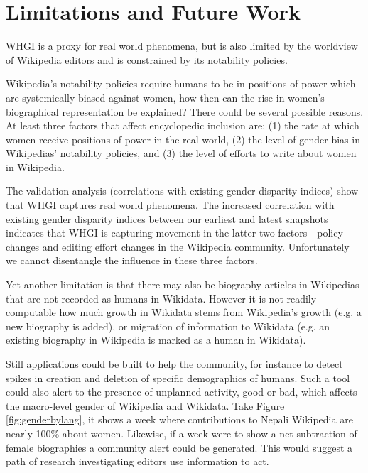 \documentclass{sig-alternate-05-2015}
\begin{document}
\section{Limitations and Future Work}
WHGI is a proxy for real world phenomena, but is also limited by the worldview of Wikipedia editors and is constrained by its notability policies. 

Wikipedia's notability policies require humans to be in positions of power which are systemically biased against women, how then can the rise in women's biographical representation be explained? There could be several possible reasons. At least three factors that affect encyclopedic inclusion are: (1) the rate at which women receive positions of power in the real world, (2) the level of gender bias in Wikipedias' notability policies, and (3) the level of efforts to write about women in Wikipedia. 

The validation analysis (correlations with existing gender disparity indices) show that WHGI captures real world phenomena. The increased correlation with existing gender disparity indices between our earliest and latest snapshots indicates that WHGI is capturing movement in the latter two factors - policy changes and editing effort changes in the Wikipedia community. Unfortunately we cannot disentangle the influence in these three factors.

Yet another limitation is that there may also be biography articles in Wikipedias that are not recorded as humans in Wikidata. However it is not readily computable how much growth in Wikidata stems from Wikipedia's growth (e.g. a new biography is added), or migration of information to Wikidata (e.g. an existing biography in Wikipedia is marked as a human in Wikidata).

Still applications could be built to help the community, for instance to detect spikes in creation and deletion of specific demographics of humans. Such a tool could also alert to the presence of unplanned activity, good or bad, which affects the macro-level gender of Wikipedia and Wikidata. Take Figure \ref{fig:genderbylang}, it shows a week where contributions to Nepali Wikipedia are nearly 100\% about women. Likewise, if a week were to show a net-subtraction of female biographies  a community alert could be generated. This would suggest a path of research investigating editors use information to act.
\end{document}
